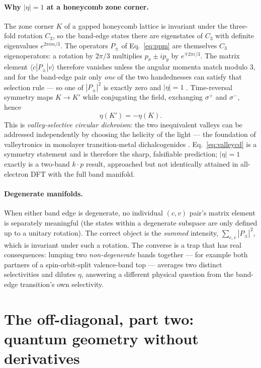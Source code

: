 \documentclass[11pt]{article}
\begin{document}
\paragraph{Why $|\eta|=1$ at a honeycomb zone corner.} The zone corner $K$ of a gapped
honeycomb lattice is invariant under the three-fold rotation $C_3$, so the band-edge
states there are eigenstates of $C_3$ with definite eigenvalues
$e^{2\pi i m/3}$. The operators $P_\pm$ of Eq.~\eqref{eq:ppm} are themselves $C_3$
eigenoperators: a rotation by $2\pi/3$ multiplies $p_x\pm ip_y$ by $e^{\mp 2\pi i/3}$.
The matrix element $\langle c|P_\pm|v\rangle$ therefore vanishes unless the angular
momenta match modulo 3, and for the band-edge pair only \emph{one} of the two
handednesses can satisfy that selection rule --- so one of $|P_\pm|^2$ is exactly zero
and $|\eta|=1$ \cite{yaoxiaoniu2008}. Time-reversal symmetry maps $K\to K'$ while
conjugating the field, exchanging $\sigma^+$ and $\sigma^-$, hence
\begin{equation}
  \eta(K') = -\eta(K).
  \label{eq:valleycd}
\end{equation}
This is \emph{valley-selective circular dichroism}: the two inequivalent valleys can be
addressed independently by choosing the helicity of the light --- the foundation of
valleytronics in monolayer transition-metal dichalcogenides
\cite{xiao2012,cao2012,mak2012}. Eq.~\eqref{eq:valleycd} is a symmetry statement and is
therefore the sharp, falsifiable prediction; $|\eta|=1$ exactly is a two-band $k\cdot p$
result, approached but not identically attained in all-electron DFT with the full band
manifold.

\paragraph{Degenerate manifolds.} When either band edge is degenerate, no individual
$(c,v)$ pair's matrix element is separately meaningful (the states within a degenerate
subspace are only defined up to a unitary rotation). The correct object is the
\emph{summed} intensity, $\sum_{c,v}|P_\pm|^2$, which is invariant under such a rotation.
The converse is a trap that has real consequences: lumping two \emph{non-degenerate}
bands together --- for example both partners of a spin-orbit-split valence-band top ---
averages two distinct selectivities and dilutes $\eta$, answering a different physical
question from the band-edge transition's own selectivity.

\section{The off-diagonal, part two: quantum geometry without derivatives}
\end{document}
